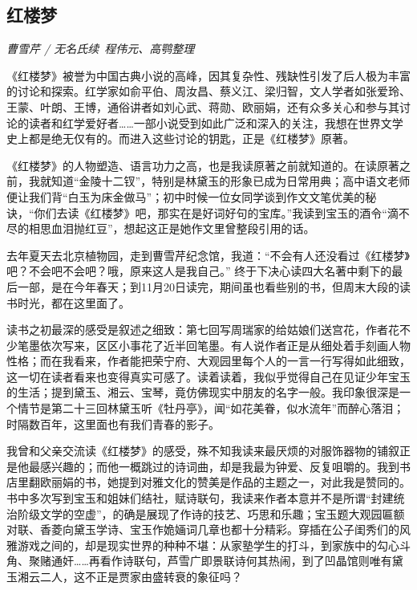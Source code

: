 \subsection*{红楼梦}
\par \emph{曹雪芹 / 无名氏续\  程伟元、高鹗整理} 
\par 《红楼梦》被誉为中国古典小说的高峰，因其复杂性、残缺性引发了后人极为丰富的讨论和探索。红学家如俞平伯、周汝昌、蔡义江、梁归智，文人学者如张爱玲、王蒙、叶朗、王博，通俗讲者如刘心武、蒋勋、欧丽娟，还有众多关心和参与其讨论的读者和红学爱好者……一部小说受到如此广泛和深入的关注，我想在世界文学史上都是绝无仅有的。而进入这些讨论的钥匙，正是《红楼梦》原著。
\par 《红楼梦》的人物塑造、语言功力之高，也是我读原著之前就知道的。在读原著之前，我就知道“金陵十二钗”，特别是林黛玉的形象已成为日常用典；高中语文老师便让我们背“白玉为床金做马”；初中时候一位女同学谈到作文文笔优美的秘诀，“你们去读《红楼梦》吧，那实在是好词好句的宝库。”我读到宝玉的酒令“滴不尽的相思血泪抛红豆”，想起这正是她作文里曾整段引用的话。
\par 去年夏天去北京植物园，走到曹雪芹纪念馆，我道：“不会有人还没看过《红楼梦》吧？不会吧不会吧？哦，原来这人是我自己。” 终于下决心读四大名著中剩下的最后一部，是在今年春天；到11月20日读完，期间虽也看些别的书，但周末大段的读书时光，都在这里面了。
\par 读书之初最深的感受是叙述之细致：第七回写周瑞家的给姑娘们送宫花，作者花不少笔墨依次写来，区区小事花了近半回笔墨。有人说作者正是从细处着手刻画人物性格；而在我看来，作者能把荣宁府、大观园里每个人的一言一行写得如此细致，这一切在读者看来也变得真实可感了。读着读着，我似乎觉得自己在见证少年宝玉的生活；提到黛玉、湘云、宝琴，竟仿佛现实中朋友的名字一般。我印象很深是一个情节是第二十三回林黛玉听《牡丹亭》，闻“如花美眷，似水流年”而醉心落泪；时隔数百年，这里面也有我们青春的影子。
\par 我曾和父亲交流读《红楼梦》的感受，殊不知我读来最厌烦的对服饰器物的铺叙正是他最感兴趣的；而他一概跳过的诗词曲，却是我最为钟爱、反复咀嚼的。我到书店里翻欧丽娟的书，她提到对雅文化的赞美是作品的主题之一，对此我是赞同的。书中多次写到宝玉和姐妹们结社，赋诗联句，我读来作者本意并不是所谓“封建统治阶级文学的空虚”，的确是展现了作诗的技艺、巧思和乐趣；宝玉题大观园匾额对联、香菱向黛玉学诗、宝玉作姽婳词几章也都十分精彩。穿插在公子闺秀们的风雅游戏之间的，却是现实世界的种种不堪：从家塾学生的打斗，到家族中的勾心斗角、聚赌通奸……再看作诗联句，芦雪广即景联诗何其热闹，到了凹晶馆则唯有黛玉湘云二人，这不正是贾家由盛转衰的象征吗？
